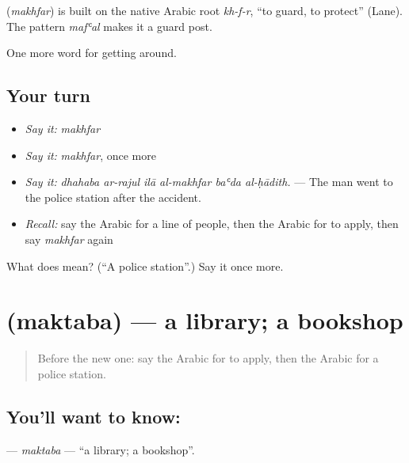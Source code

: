 \begin{cousinweb}
\textbf{} (\emph{makhfar}) is built on the native Arabic root \emph{kh-f-r}, \textquotedblleft{}to guard, to protect\textquotedblright{} (Lane). The pattern \emph{mafʿal} makes it a guard post.
\end{cousinweb}

\begin{grammarlens}[title={What you've built}]
One more word for getting around.
\end{grammarlens}

\subsection*{Your turn}
\begin{itemize}
\raggedright
  \item \emph{Say it:} \emph{makhfar}
  \item \emph{Say it:} \emph{makhfar}, once more
  \item \emph{Say it:} \emph{dhahaba ar-rajul ilā al-makhfar baʿda al-ḥādith.} — The man went to the police station after the accident.
  \item \emph{Recall:} say the Arabic for a line of people, then the Arabic for to apply, then say \emph{makhfar} again
\end{itemize}

\begin{tcolorbox}[breakable,colback=teal!4,colframe=teal!35!black,title={Before you move on}]
What does  mean? (\textquotedblleft{}A police station\textquotedblright{}.) Say it once more.
\end{tcolorbox}
\section[\texorpdfstring{\ar{مكتبة} (maktaba)}{مكتبة (maktaba)}]{ (maktaba) — a library; a bookshop}

\label{lesson:AR-C451-maktaba}



\begin{quote}
Before the new one: say the Arabic for to apply, then the Arabic for a police station.
\end{quote}

\subsection*{You'll want to know: }
\textbf{} — \emph{maktaba} — \textquotedblleft{}a library; a bookshop\textquotedblright{}.

